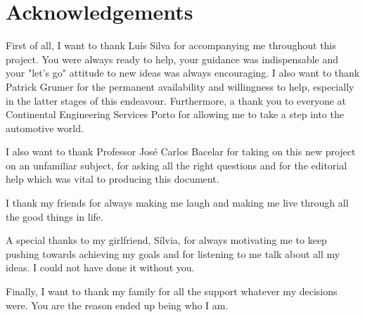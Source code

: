 \chapter*{Acknowledgements}

First of all, I want to thank Luís Silva for accompanying me throughout this project. You were always ready to help, your guidance was indispensable and your "let's go" attitude to new ideas was always encouraging. I also want to thank Patrick Grumer for the permanent availability and willingness to help, especially in the latter stages of this endeavour. Furthermore, a thank you to everyone at Continental Engineering Services Porto for allowing me to take a step into the automotive world.\par

I also want to thank Professor José Carlos Bacelar for taking on this new project on an unfamiliar subject, for asking all the right questions and for the editorial help which was vital to producing this document.\par

I thank my friends for always making me laugh and making me live through all the good things in life.

A special thanks to my girlfriend, Sílvia, for always motivating me to keep pushing towards achieving my goals and for listening to me talk about all my ideas. I could not have done it without you.\par

Finally, I want to thank my family for all the support whatever my decisions were. You are the reason ended up being who I am.
